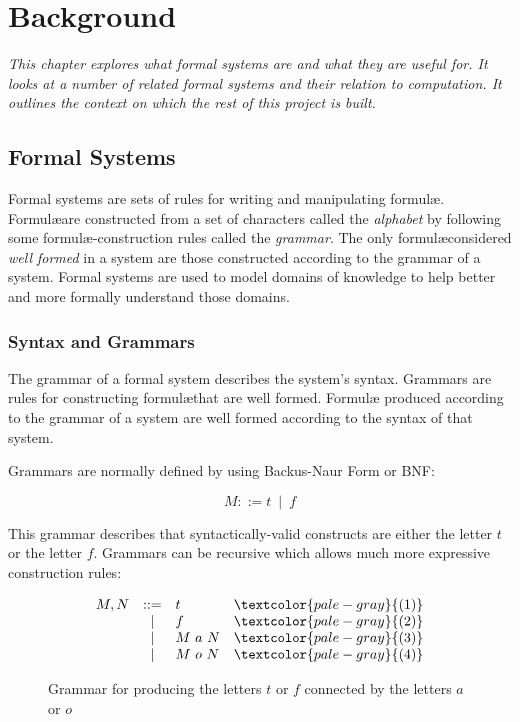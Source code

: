 
\chapter{Background}\label{chapter:background}

\textit{
This chapter explores what \emph{formal systems} are and what they are useful for. 
It looks at a number of related formal systems and their relation to computation. 
It outlines the context on which the rest of this project is built.
}


\section{Formal Systems}

Formal systems are sets of rules for writing and manipulating
formul\ae. Formul\ae are constructed from a set of characters called the
\emph{alphabet} by following some formul\ae-construction rules called
the \emph{grammar}. The only formul\ae considered \emph{well formed} in
a system are those constructed according to the grammar of a system.
Formal systems are used to model domains of knowledge to help better
and more formally understand those domains.

\subsection{Syntax and Grammars}

The grammar of a formal system describes the system's syntax. Grammars are 
rules for constructing formul\ae that are well formed. Formul\ae
produced according to the grammar of a system are well formed according to 
the syntax of that system.

Grammars are normally defined by using Backus-Naur Form or BNF:

\[
  M ::= t\ \mid\ f
\]

This grammar describes that syntactically-valid constructs are either the letter $t$ or the letter $f$. 
Grammars can be recursive which allows much more expressive construction rules:

\begin{figure}[!h]\label{fig:tf-grammar}
\[
  \begin{array}{lclr}
    M,N&::=&t&\textcolor{pale-gray}{(1)} \\
      &|&f&\textcolor{pale-gray}{(2)} \\
      &|&M\ a\ N&\textcolor{pale-gray}{(3)} \\
      &|&M\ o\ N&\textcolor{pale-gray}{(4)}
  \end{array}
\]
\caption{Grammar for producing the letters $t$ or $f$ connected by the letters $a$ or $o$}
\end{figure}

